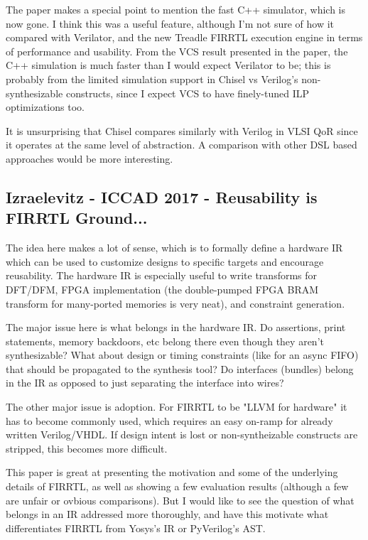 The paper makes a special point to mention the fast C++ simulator, which is now gone. I think this was a useful feature, although I'm not sure of how it compared with Verilator, and the new Treadle FIRRTL execution engine in terms of performance and usability. From the VCS result presented in the paper, the C++ simulation is much faster than I would expect Verilator to be; this is probably from the limited simulation support in Chisel vs Verilog's non-synthesizable constructs, since I expect VCS to have finely-tuned ILP optimizations too.

It is unsurprising that Chisel compares similarly with Verilog in VLSI QoR since it operates at the same level of abstraction. A comparison with other DSL based approaches would be more interesting.

\subsection{Izraelevitz - ICCAD 2017 - Reusability is FIRRTL Ground...}
The idea here makes a lot of sense, which is to formally define a hardware IR which can be used to customize designs to specific targets and encourage reusability. The hardware IR is especially useful to write transforms for DFT/DFM, FPGA implementation (the double-pumped FPGA BRAM transform for many-ported memories is very neat), and constraint generation.

{\color{blue} The major issue here is what belongs in the hardware IR. Do assertions, print statements, memory backdoors, etc belong there even though they aren't synthesizable? What about design or timing constraints (like for an async FIFO) that should be propagated to the synthesis tool? Do interfaces (bundles) belong in the IR as opposed to just separating the interface into wires?}

{\color{blue} The other major issue is adoption. For FIRRTL to be "LLVM for hardware" it has to become commonly used, which requires an easy on-ramp for already written Verilog/VHDL. If design intent is lost or non-syntheizable constructs are stripped, this becomes more difficult.}

{\color{blue} This paper is great at presenting the motivation and some of the underlying details of FIRRTL, as well as showing a few evaluation results (although a few are unfair or ovbious comparisons). But I would like to see the question of what belongs in an IR addressed more thoroughly, and have this motivate what differentiates FIRRTL from Yosys's IR or PyVerilog's AST.}

